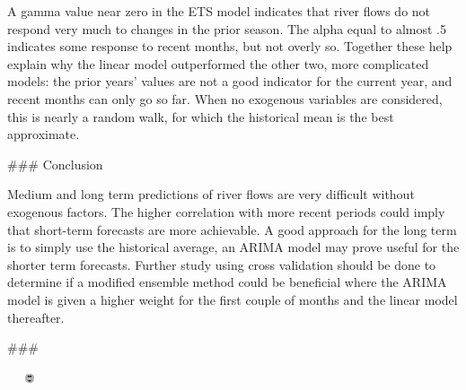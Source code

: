 \documentclass[
]{article}
\begin{document}
\begin{multicols}{4}
A gamma value near zero in the ETS model indicates that river flows do not respond very much to changes in the prior season. The alpha equal to almost .5 indicates some response to recent months, but not overly so. Together these help explain why the linear model outperformed the other two, more complicated models: the prior years' values are not a good indicator for the current year, and recent months can only go so far. When no exogenous variables are considered, this is nearly a random walk, for which the historical mean is the best approximate. 


### Conclusion

Medium and long term predictions of river flows are very difficult without exogenous factors. The higher correlation with more recent periods could imply that short-term forecasts are more achievable. A good approach for the long term is to simply use the historical average, an ARIMA model may prove useful for the shorter term forecasts. Further study using cross validation should be done to determine if a modified ensemble method could be beneficial where the ARIMA model is given a higher weight for the first couple of months and the linear model thereafter. 

### 


\begin{flushright}\includegraphics[width=50px,height=10px]{BC Logo3} \end{flushright}


\end{multicols}
\end{document}

